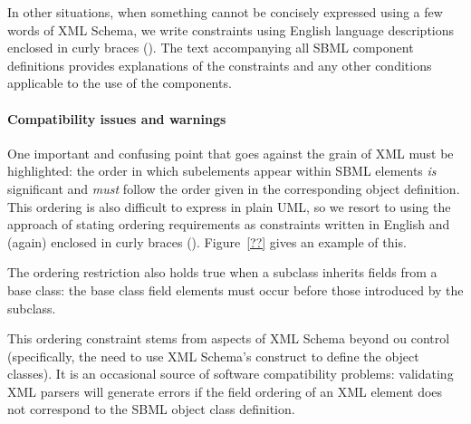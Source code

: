 \begin{blockChanged}
In other situations, when something cannot be concisely expressed
using a few words of XML Schema, we write constraints using
English language descriptions enclosed in curly braces
(\token{\{\}}).  The text accompanying all SBML component
definitions provides explanations of the constraints and any other
conditions applicable to the use of the components.


\paragraph{Compatibility issues and warnings}

One important and confusing point that goes against the grain of
XML must be highlighted: the order in which subelements appear
within SBML elements \emph{is} significant and \emph{must} follow
the order given in the corresponding object definition.  This
ordering is also difficult to express in plain UML, so we resort
to using the approach of stating ordering requirements as
constraints written in English and (again) enclosed in curly
braces (\token{\{\}}).  Figure~\vref{??} gives an example of this.

The ordering restriction also holds true when a subclass inherits
fields from a base class: the base class field elements must occur
before those introduced by the subclass.

This ordering constraint stems from aspects of XML Schema beyond
ou control (specifically, the need to use XML Schema's
 construct to define the object classes).  It is
an occasional source of software compatibility problems:
validating XML parsers will generate errors if the field ordering
of an XML element does not correspond to the SBML object class
definition.


\end{blockChanged}
